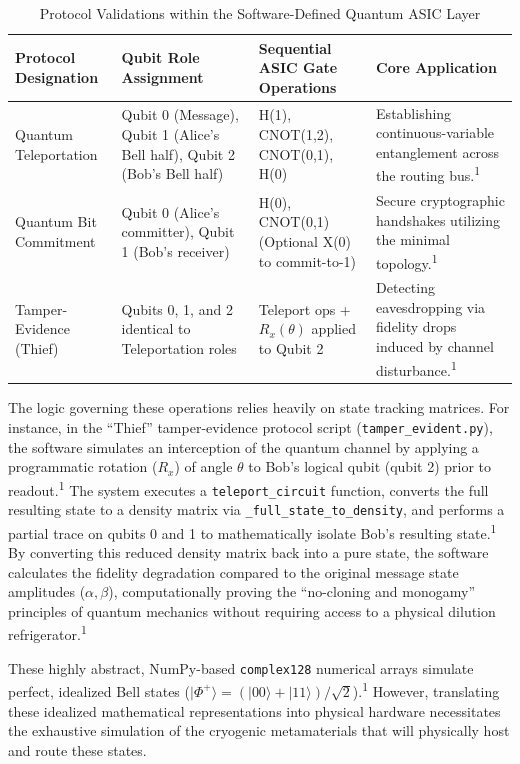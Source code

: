 \documentclass[11pt, a4paper]{article}
\begin{document}
\begin{table}[htbp]
\centering
\renewcommand{\arraystretch}{1.5}
\begin{tabularx}{\textwidth}{>{\raggedright\arraybackslash}p{3cm} >{\raggedright\arraybackslash}X >{\raggedright\arraybackslash}X >{\raggedright\arraybackslash}X}
\toprule
\textbf{Protocol Designation} & \textbf{Qubit Role Assignment} & \textbf{Sequential ASIC Gate Operations} & \textbf{Core Application} \\
\midrule
Quantum Teleportation & Qubit 0 (Message), Qubit 1 (Alice's Bell half), Qubit 2 (Bob's Bell half) & H(1), CNOT(1,2), CNOT(0,1), H(0) & Establishing continuous-variable entanglement across the routing bus.\textsuperscript{1} \\
Quantum Bit Commitment & Qubit 0 (Alice's committer), Qubit 1 (Bob's receiver) & H(0), CNOT(0,1) (Optional X(0) to commit-to-1) & Secure cryptographic handshakes utilizing the minimal topology.\textsuperscript{1} \\
Tamper-Evidence (Thief) & Qubits 0, 1, and 2 identical to Teleportation roles & Teleport ops + $R_x(\theta)$ applied to Qubit 2 & Detecting eavesdropping via fidelity drops induced by channel disturbance.\textsuperscript{1} \\
\bottomrule
\end{tabularx}
\caption{Protocol Validations within the Software-Defined Quantum ASIC Layer}
\end{table}

The logic governing these operations relies heavily on state tracking matrices. For instance, in the ``Thief'' tamper-evidence protocol script (\texttt{tamper\_evident.py}), the software simulates an interception of the quantum channel by applying a programmatic rotation ($R_x$) of angle $\theta$ to Bob's logical qubit (qubit 2) prior to readout.\textsuperscript{1} The system executes a \texttt{teleport\_circuit} function, converts the full resulting state to a density matrix via \texttt{\_full\_state\_to\_density}, and performs a partial trace on qubits 0 and 1 to mathematically isolate Bob's resulting state.\textsuperscript{1} By converting this reduced density matrix back into a pure state, the software calculates the fidelity degradation compared to the original message state amplitudes ($\alpha, \beta$), computationally proving the ``no-cloning and monogamy'' principles of quantum mechanics without requiring access to a physical dilution refrigerator.\textsuperscript{1}

These highly abstract, NumPy-based \texttt{complex128} numerical arrays simulate perfect, idealized Bell states ($|\Phi^+\rangle = (|00\rangle + |11\rangle)/\sqrt{2}$).\textsuperscript{1} However, translating these idealized mathematical representations into physical hardware necessitates the exhaustive simulation of the cryogenic metamaterials that will physically host and route these states.
\end{document}
